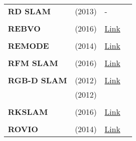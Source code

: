 \documentclass[a4paper,12pt]{scrartcl}
\begin{document}
{\begin{longtable}{l|l|l|l}
    \textbf{RD SLAM}       & \cite{Tan2013a} (2013)            & -                                                                  &                       \\
                           &                                   &                                                                    &                       \\
    \textbf{REBVO}         & \cite{Tarrio2016} (2016)          & {\href{https://github.com/JuanTarrio/rebvo}{Link}}                 &                       \\
                           &                                   &                                                                    &                       \\
    \textbf{REMODE}        & \cite{Pizzoli2014} (2014)         & {\href{https://github.com/uzh-rpg/rpg_open_remode}{Link}}          &                       \\
                           &                                   &                                                                    &                       \\
    \textbf{RFM SLAM}      & \cite{Agarwal2016} (2016)         & {\href{https://github.com/sauravag/edpl-rfmslam}{Link}}            &                       \\
                           &                                   &                                                                    &                       \\
    \textbf{RGB-D SLAM}    & \cite{Endres2012} (2012)          & {\href{https://github.com/felixendres/rgbdslam_v2}{Link}}          &                       \\
                           & \cite{Endres2012a} (2012)         &                                                                    &                       \\
                           &                                   &                                                                    &                       \\
    \textbf{RKSLAM}        & \cite{Liu2016} (2016)             & {\href{https://zjucvg.net/rkslam/rkslam.html}{Link}}               &                       \\
                           &                                   &                                                                    &                       \\
    \textbf{ROVIO}         & \cite{Bloesch2015} (2014)         & {\href{https://github.com/ethz-asl/rovio}{Link}}                   &                       \\

\end{longtable}}
\end{document}
